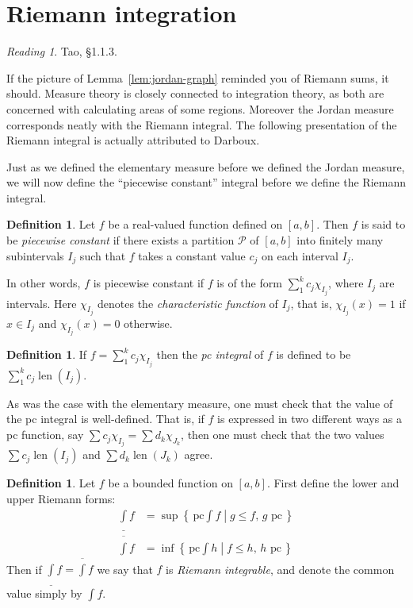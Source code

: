 \documentclass[11pt,oneside]{amsbook}
\newcommand{\set}[1]{\left\{\,#1\,\right\}}
\DeclareMathOperator{\len}{len}
\newcommand{\lint}{\underline\int}
\newcommand{\ovint}{\overline\int}
\theoremstyle{definition}
\theoremstyle{plain}
\theoremstyle{definition}
\newtheorem{defn}[thm]{Definition}
\theoremstyle{remark}
\newtheorem*{reading}{Reading}
\numberwithin{equation}{section}
\numberwithin{figure}{section}
\begin{document}
\newpage
\section{Riemann integration}

\begin{reading}
  Tao, \S1.1.3.
\end{reading}

If the picture of Lemma~\ref{lem:jordan-graph} reminded you of Riemann sums, it should. Measure theory is closely connected to integration theory, as both are concerned with calculating areas of some regions. Moreover the Jordan measure corresponds neatly with the Riemann integral. The following presentation of the Riemann integral is actually attributed to Darboux.

Just as we defined the elementary measure before we defined the Jordan measure, we will now define the ``piecewise constant'' integral before we define the Riemann integral.

\begin{defn}
  Let $f$ be a real-valued function defined on $[a,b]$. Then $f$ is said to be \emph{piecewise constant} if there exists a partition $\mathcal P$ of $[a,b]$ into finitely many subintervals $I_j$ such that $f$ takes a constant value $c_j$ on each interval $I_j$.
\end{defn}

In other words, $f$ is piecewise constant if $f$ is of the form $\sum_1^k c_j\chi_{I_j}$, where $I_j$ are intervals. Here $\chi_{I_j}$ denotes the \emph{characteristic function} of $I_j$, that is, $\chi_{I_j}(x)=1$ if $x\in I_j$ and $\chi_{I_j}(x)=0$ otherwise.

\begin{defn}
  If $f=\sum_1^kc_j\chi_{I_j}$ then the \emph{pc integral} of $f$ is defined to be $\sum_1^kc_j\len(I_j)$.
\end{defn}

As was the case with the elementary measure, one must check that the value of the pc integral is well-defined. That is, if $f$ is expressed in two different ways as a pc function, say $\sum c_j\chi_{I_j}=\sum d_k\chi_{J_k}$, then one must check that the two values $\sum c_j\len(I_j)$ and $\sum d_k\len(J_k)$ agree.

\begin{defn}
  Let $f$ be a bounded function on $[a,b]$. First define the lower and upper Riemann forms:
  \begin{align*}
    \lint f&=\sup\set{\left.\text{pc}\!\!\int\!\! f\;\right|\;g\leq f\text{, $g$ pc}}\\
    \ovint f&=\inf\set{\left.\text{pc}\!\!\int\!\! h\;\right|\;f\leq h\text{, $h$ pc}}
  \end{align*}
  Then if $\lint f=\ovint f$ we say that $f$ is \emph{Riemann integrable}, and denote the common value simply by $\int f$.
\end{defn}
\end{document}
